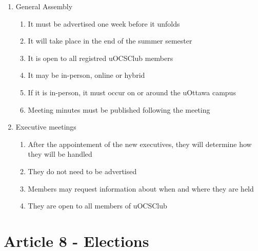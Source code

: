 \begin{enumerate}
    \item General Assembly
        \begin{enumerate}
            \item It must be advertised one week before it unfolds
            \item It will take place in the end of the summer semester
            \item It is open to all registred uOCSClub members
            \item It may be in-person, online or hybrid
            \item If it is in-person, it must occur on or around the uOttawa campus
            \item Meeting minutes must be published following the meeting
        \end{enumerate}
    \item Executive meetings
        \begin{enumerate}
            \item After the appointement of the new executives, they will determine how they will be handled
            \item They do not need to be advertised
            \item Members may request information about when and where they are held
            \item They are open to all members of uOCSClub
        \end{enumerate}
\end{enumerate}

\section*{Article 8 - Elections}



